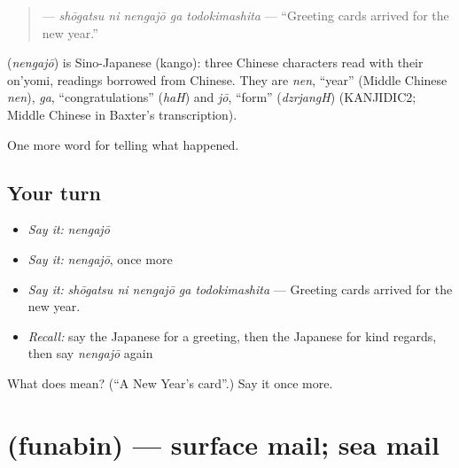 \begin{quote}
\textbf{  } — \emph{shōgatsu ni nengajō ga todokimashita} — \textquotedblleft{}Greeting cards arrived for the new year.\textquotedblright{}
\end{quote}

\begin{cousinweb}
\textbf{} (\emph{nengajō}) is Sino-Japanese (kango): three Chinese characters read with their on'yomi, readings borrowed from Chinese. They are \emph{nen}, \textquotedblleft{}year\textquotedblright{} (Middle Chinese \emph{nen}), \emph{ga}, \textquotedblleft{}congratulations\textquotedblright{} (\emph{haH}) and \emph{jō}, \textquotedblleft{}form\textquotedblright{} (\emph{dzrjangH}) (KANJIDIC2; Middle Chinese in Baxter's transcription).
\end{cousinweb}

\begin{grammarlens}[title={What you've built}]
One more word for telling what happened.
\end{grammarlens}

\subsection*{Your turn}
\begin{itemize}
\raggedright
  \item \emph{Say it:} \emph{nengajō}
  \item \emph{Say it:} \emph{nengajō}, once more
  \item \emph{Say it:} \emph{shōgatsu ni nengajō ga todokimashita} — Greeting cards arrived for the new year.
  \item \emph{Recall:} say the Japanese for a greeting, then the Japanese for kind regards, then say \emph{nengajō} again
\end{itemize}

\begin{tcolorbox}[breakable,colback=teal!4,colframe=teal!35!black,title={Before you move on}]
What does  mean? (\textquotedblleft{}A New Year's card\textquotedblright{}.) Say it once more.
\end{tcolorbox}
\section[\texorpdfstring{\ja{ふなびん} (funabin)}{ふなびん (funabin)}]{ (funabin) — surface mail; sea mail}

